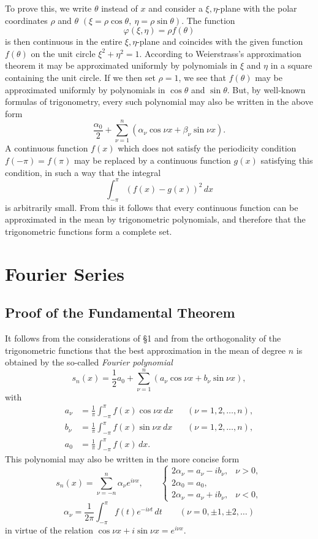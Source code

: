 To prove this, we write $\theta$ instead of $x$ and consider a $\xi,\eta$-plane with the polar coordinates $\rho$ and $\theta$ $(\xi=\rho\cos\theta,\ \eta=\rho\sin\theta)$. The function
\[
\varphi(\xi,\eta)=\rho f(\theta)
\]
is then continuous in the entire $\xi,\eta$-plane and coincides with the given function $f(\theta)$ on the unit circle $\xi^2+\eta^2=1$. According to Weierstrass's approximation theorem it may be approximated uniformly by polynomials in $\xi$ and $\eta$ in a square containing the unit circle. If we then set $\rho=1$, we see that $f(\theta)$ may be approximated uniformly by polynomials in $\cos\theta$ and $\sin\theta$. But, by well-known formulas of trigonometry, every such polynomial may also be written in the above form
\[
\frac{\alpha_0}{2}+\sum_{\nu=1}^{n}(\alpha_\nu\cos\nu x+\beta_\nu\sin\nu x).
\]
A continuous function $f(x)$ which does not satisfy the periodicity condition $f(-\pi)=f(\pi)$ may be replaced by a continuous function $g(x)$ satisfying this condition, in such a way that the integral
\[
\int_{-\pi}^{\pi}(f(x)-g(x))^2\,dx
\]
is arbitrarily small. From this it follows that every continuous function can be approximated in the mean by trigonometric polynomials, and therefore that the trigonometric functions form a complete set.

\section{Fourier Series}
\subsection{Proof of the Fundamental Theorem}
It follows from the considerations of \S1 and from the orthogonality of the trigonometric functions that the best approximation in the mean of degree $n$ is obtained by the so-called \emph{Fourier polynomial}
\[
s_n(x)=\frac12a_0+\sum_{\nu=1}^{n}(a_\nu\cos\nu x+b_\nu\sin\nu x),
\]
with
\begin{equation}
\begin{aligned}
a_\nu&=\frac1\pi\int_{-\pi}^{\pi}f(x)\cos\nu x\,dx &&(\nu=1,2,\ldots,n),\\
b_\nu&=\frac1\pi\int_{-\pi}^{\pi}f(x)\sin\nu x\,dx &&(\nu=1,2,\ldots,n),\\
a_0&=\frac1\pi\int_{-\pi}^{\pi}f(x)\,dx.
\end{aligned}
\tag{15}
\end{equation}
This polynomial may also be written in the more concise form
\[
s_n(x)=\sum_{\nu=-n}^{n}\alpha_\nu e^{i\nu x},\qquad
\begin{cases}
2\alpha_\nu=a_\nu-i b_\nu,&\nu>0,\\
2\alpha_0=a_0,&\\
2\alpha_\nu=a_\nu+i b_\nu,&\nu<0,
\end{cases}
\]
\begin{equation}
\alpha_\nu=\frac{1}{2\pi}\int_{-\pi}^{\pi}f(t)e^{-i\nu t}\,dt
\qquad(\nu=0,\pm1,\pm2,\ldots)
\tag{15'}
\end{equation}
in virtue of the relation $\cos\nu x+i\sin\nu x=e^{i\nu x}$.

